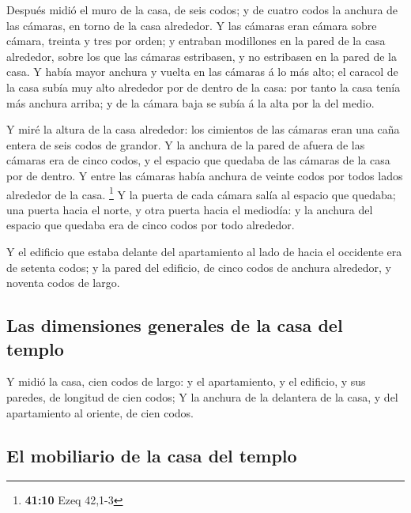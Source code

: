  Después midió el muro de la casa, de seis codos; y de
cuatro codos la anchura de las cámaras, en torno de la casa alrededor.
 Y las cámaras eran cámara sobre cámara, treinta y tres por
orden; y entraban modillones en la pared de la casa alrededor, sobre los
que las cámaras estribasen, y no estribasen en la pared de la casa.
 Y había mayor anchura y vuelta en las cámaras á lo más
alto; el caracol de la casa subía muy alto alrededor por de dentro de la
casa: por tanto la casa tenía más anchura arriba; y de la cámara baja se
subía á la alta por la del medio.

 Y miré la altura de la casa alrededor: los cimientos de las
cámaras eran una caña entera de seis codos de grandor.  Y la
anchura de la pared de afuera de las cámaras era de cinco codos, y el
espacio que quedaba de las cámaras de la casa por de dentro.
 Y entre las cámaras había anchura de veinte codos por
todos lados alrededor de la casa. \footnote{\textbf{41:10} Ezeq 42,1-3}
 Y la puerta de cada cámara salía al espacio que quedaba;
una puerta hacia el norte, y otra puerta hacia el mediodía: y la anchura
del espacio que quedaba era de cinco codos por todo alrededor.

 Y el edificio que estaba delante del apartamiento al lado
de hacia el occidente era de setenta codos; y la pared del edificio, de
cinco codos de anchura alrededor, y noventa codos de largo.

\hypertarget{las-dimensiones-generales-de-la-casa-del-templo}{%
\subsection{Las dimensiones generales de la casa del
templo}\label{las-dimensiones-generales-de-la-casa-del-templo}}

 Y midió la casa, cien codos de largo: y el apartamiento, y
el edificio, y sus paredes, de longitud de cien codos;  Y
la anchura de la delantera de la casa, y del apartamiento al oriente, de
cien codos.

\hypertarget{el-mobiliario-de-la-casa-del-templo}{%
\subsection{El mobiliario de la casa del
templo}\label{el-mobiliario-de-la-casa-del-templo}}

